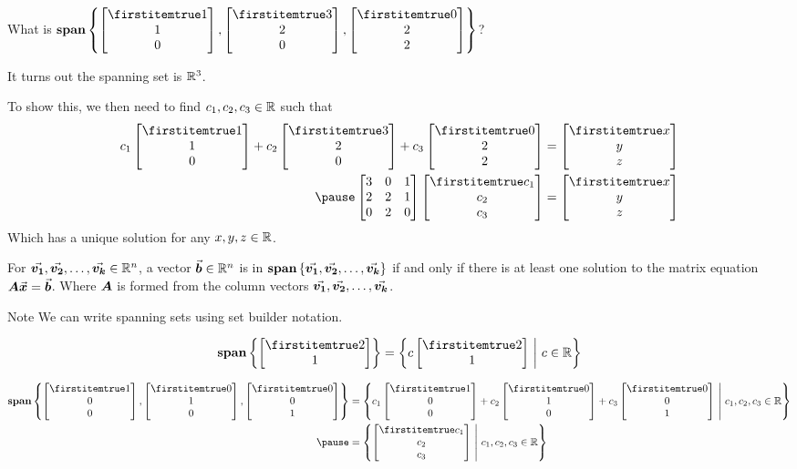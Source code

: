 \documentclass{beamer}
\begin{document}
\begin{frame}
\begin{example}
What is $\spn\left\{\bvector{1,1,0},\bvector{3,2,0},\bvector{0,2,2}\right\}$?\ \pause

\vspace{2mm}
It turns out the spanning set is $\mathbb{R}^3$.\pause

\vspace{2mm}
To show this, we then need to find $c_1, c_2, c_3\in\mathbb{R}$ such that 
\begin{equation*}
\begin{aligned}
c_1\bvector{1,1,0}+c_2\bvector{3,2,0}+c_3\bvector{0,2,2} &= \bvector{x,y,z} \\\pause
\begin{bmatrix}
3 & 0 & 1 \\
2 & 2 & 1 \\
0 & 2 & 0 \\
\end{bmatrix}
\bvector{c_1,c_2,c_3}&=\bvector{x,y,z}
\end{aligned}
\end{equation*}\pause
Which has a unique solution for any $x,y,z\in\mathbb{R}$.
\end{example}
\end{frame}

\begin{frame}
\begin{theorem}
For ${\vec{\boldsymbol{v_1}}},{\vec{\boldsymbol{v_2}}},\dots,{\vec{\boldsymbol{v_k}}}\in\mathbb{R}^n$, a vector ${\vec{\boldsymbol{b}}}\in\mathbb{R}^n$ is in $\operatorname{\textbf{span}}\left\{{\vec{\boldsymbol{v_1}}},{\vec{\boldsymbol{v_2}}},\dots,{\vec{\boldsymbol{v_k}}}\right\}$ if and only if there is at least one solution to the matrix equation $\boldsymbol{A}{\vec{\boldsymbol{x}}}={\vec{\boldsymbol{b}}}$. Where $\boldsymbol{A}$ is formed from the column vectors ${\vec{\boldsymbol{v_1}}},{\vec{\boldsymbol{v_2}}},\dots,{\vec{\boldsymbol{v_k}}}$.
\end{theorem}\pause
\begin{block}{Note}
We can write spanning sets using set builder notation.
\end{block}
\end{frame}

\begin{frame}
\begin{example}
\begin{equation*}
\spn\left\{\bvector{2,1}\right\}=\setbuilder{c\bvector{2,1}}{c\in\R}
\end{equation*}
\end{example}\pause

\begin{example}
\begin{equation*}
\begin{aligned}
\spn\left\{\bvector{1,0,0},\bvector{0,1,0},\bvector{0,0,1}\right\} &= 
\setbuilder{c_1\bvector{1,0,0}+c_2\bvector{0,1,0}+c_3\bvector{0,0,1}}{c_1,c_2,c_3\in\R}\\\pause
&=\setbuilder{\bvector{c_1,c_2,c_3}}{c_1,c_2,c_3\in\R}
\end{aligned}
\end{equation*}
\end{example}
\end{frame}
\end{document}
